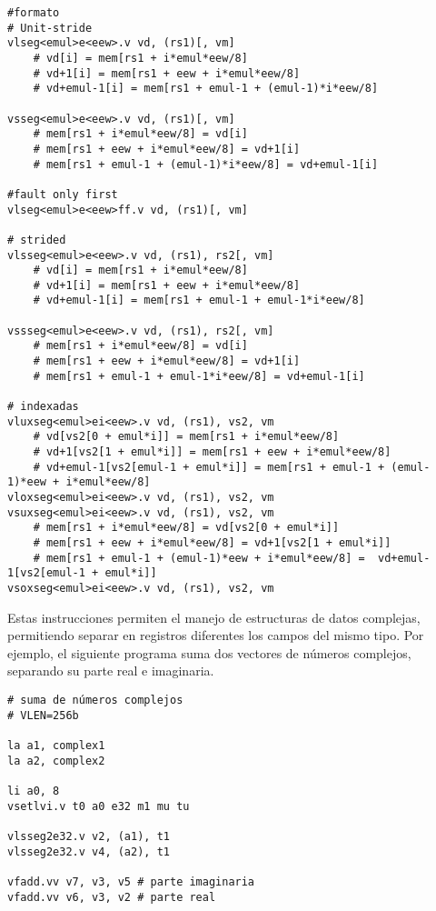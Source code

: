 \begin{lstlisting}
#formato
# Unit-stride
vlseg<emul>e<eew>.v vd, (rs1)[, vm] 
    # vd[i] = mem[rs1 + i*emul*eew/8] 
    # vd+1[i] = mem[rs1 + eew + i*emul*eew/8]
    # vd+emul-1[i] = mem[rs1 + emul-1 + (emul-1)*i*eew/8]

vsseg<emul>e<eew>.v vd, (rs1)[, vm]
    # mem[rs1 + i*emul*eew/8] = vd[i]
    # mem[rs1 + eew + i*emul*eew/8] = vd+1[i]
    # mem[rs1 + emul-1 + (emul-1)*i*eew/8] = vd+emul-1[i]

#fault only first
vlseg<emul>e<eew>ff.v vd, (rs1)[, vm]

# strided
vlsseg<emul>e<eew>.v vd, (rs1), rs2[, vm]
    # vd[i] = mem[rs1 + i*emul*eew/8] 
    # vd+1[i] = mem[rs1 + eew + i*emul*eew/8]
    # vd+emul-1[i] = mem[rs1 + emul-1 + emul-1*i*eew/8]

vssseg<emul>e<eew>.v vd, (rs1), rs2[, vm]
    # mem[rs1 + i*emul*eew/8] = vd[i]                   
    # mem[rs1 + eew + i*emul*eew/8] = vd+1[i]
    # mem[rs1 + emul-1 + emul-1*i*eew/8] = vd+emul-1[i]

# indexadas
vluxseg<emul>ei<eew>.v vd, (rs1), vs2, vm
    # vd[vs2[0 + emul*i]] = mem[rs1 + i*emul*eew/8]
    # vd+1[vs2[1 + emul*i]] = mem[rs1 + eew + i*emul*eew/8]
    # vd+emul-1[vs2[emul-1 + emul*i]] = mem[rs1 + emul-1 + (emul-1)*eew + i*emul*eew/8]
vloxseg<emul>ei<eew>.v vd, (rs1), vs2, vm
vsuxseg<emul>ei<eew>.v vd, (rs1), vs2, vm
    # mem[rs1 + i*emul*eew/8] = vd[vs2[0 + emul*i]]
    # mem[rs1 + eew + i*emul*eew/8] = vd+1[vs2[1 + emul*i]]
    # mem[rs1 + emul-1 + (emul-1)*eew + i*emul*eew/8] =  vd+emul-1[vs2[emul-1 + emul*i]]
vsoxseg<emul>ei<eew>.v vd, (rs1), vs2, vm

\end{lstlisting}

Estas instrucciones permiten el manejo de estructuras de datos complejas,
permitiendo separar en registros diferentes los campos del mismo tipo. Por
ejemplo, el siguiente programa suma dos vectores de números complejos,
separando su parte real e imaginaria.

\begin{lstlisting}
# suma de números complejos
# VLEN=256b

la a1, complex1
la a2, complex2

li a0, 8 
vsetlvi.v t0 a0 e32 m1 mu tu

vlsseg2e32.v v2, (a1), t1
vlsseg2e32.v v4, (a2), t1

vfadd.vv v7, v3, v5 # parte imaginaria
vfadd.vv v6, v3, v2 # parte real
\end{lstlisting}


